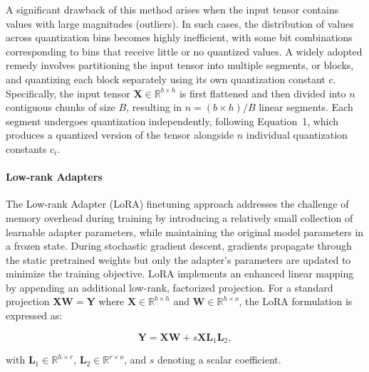 A significant drawback of this method arises when the input tensor contains values with large magnitudes (outliers). In such cases, the distribution of values across quantization bins becomes highly inefficient, with some bit combinations corresponding to bins that receive little or no quantized values. A widely adopted remedy involves partitioning the input tensor into multiple segments, or blocks, and quantizing each block separately using its own quantization constant $c$. Specifically, the input tensor $\mathbf{X}\in \mathbb{R}^{b\times h}$ is first flattened and then divided into $n$ contiguous chunks of size $B$, resulting in ${n = ({b\times h} )/{B} }$ linear segments. Each segment undergoes quantization independently, following Equation~1, which produces a quantized version of the tensor alongside $n$ individual quantization constants $c_i$.

\paragraph{Low-rank Adapters} The Low-rank Adapter (LoRA) finetuning approach \citep{hu2021lora} addresses the challenge of memory overhead during training by introducing a relatively small collection of learnable adapter parameters, while maintaining the original model parameters in a frozen state. During stochastic gradient descent, gradients propagate through the static pretrained weights but only the adapter’s parameters are updated to minimize the training objective. LoRA implements an enhanced linear mapping by appending an additional low-rank, factorized projection. For a standard projection ${\mathbf{X} \mathbf{W} = \mathbf{Y}}$ where $\mathbf{X}\in  \mathbb{R}^{b\times h}$ and $\mathbf{W}\in  \mathbb{R}^{h\times o}$, the LoRA formulation is expressed as:

\begin{equation}
    \mathbf{Y} = \mathbf{X}\mathbf{W} + s\mathbf{X}\mathbf{L}_1\mathbf{L}_2,
\end{equation}

with $\mathbf{L}_1\in  \mathbb{R}^{h\times r}$, $\mathbf{L}_2\in  \mathbb{R}^{r\times o}$, and $s$ denoting a scalar coefficient.

